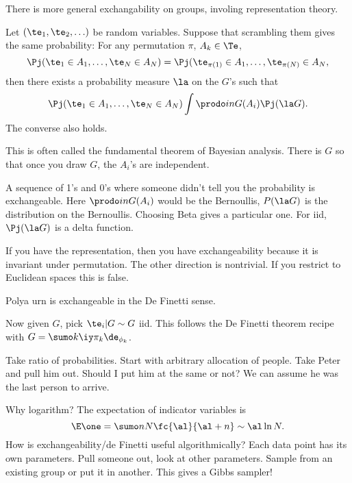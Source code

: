 There is more general exchangability on groups, involing representation theory.


\begin{thm}[De Finetti]
Let $(\te_1,\te_2,\ldots)$ be random variables. Suppose that scrambling them gives the same probability: For any permutation $\pi$, $A_k\in \Te$,
$$
\Pj(\te_1\in A_1,\ldots, \te_N\in A_N)
= \Pj(\te_{\pi(1)}\in A_1,\ldots, \te_{\pi(N)}\in A_N,
$$
then 
there exists a probability measure  $\la$ on the $G$'s such that $$
\Pj(\te_1\in A_1,\ldots, \te_N\in A_N)
\int \prodo in G(A_i)\Pj(\la G).
$$
The converse also holds.
\end{thm}
This is often called the fundamental theorem of Bayesian analysis. There is $G$ so that once you draw $G$, the $A_i$'s are independent.

A sequence of 1's and 0's where someone didn't tell you the probability is exchangeable. Here $\prodo in G(A_i)$ would be the Bernoullis, $P(\la G)$ is the distribution on the Bernoullis. Choosing Beta gives a particular one. %
For iid, $\Pj(\la G)$ is a delta function.

If you have the representation, then you have exchangeability because it is invariant under permutation. The other direction is  nontrivial.
If you restrict to Euclidean spaces this is false.

Polya urn is exchangeable in the De Finetti sense. %

Now given $G$, pick $\te_i|G \sim G$ iid. This follows the De Finetti theorem recipe with 
 $G=\sumo k\iy \pi_k \de_{\phi_k}$. 

Take ratio of probabilities. Start with arbitrary allocation of people. Take Peter and pull him out. Should I put him at the same or not? We can assume he was the last person to arrive. %

Why logarithm? The expectation of indicator variables is
$$
\E \one= \sumo nN \fc{\al}{\al+n}\sim \al\ln N.
$$
How is exchangeability/de Finetti useful algorithmically? 
Each data point has its own parameters. Pull someone out, look at other parameters. Sample from an existing group or put it in another. This gives a Gibbs sampler!

